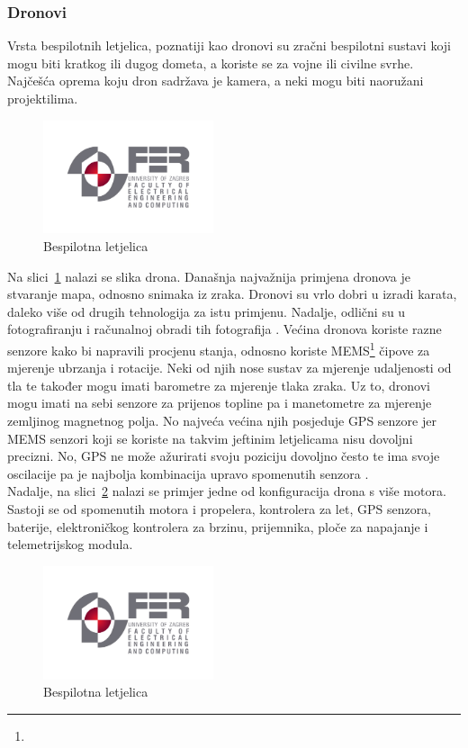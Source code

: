 \documentclass[times, utf8, diplomski]{fer}
\begin{document}
\subsubsection{Dronovi}
Vrsta bespilotnih letjelica, poznatiji kao dronovi su zračni bespilotni sustavi koji mogu biti kratkog ili dugog dometa, a koriste se za vojne ili civilne svrhe. Najčešća oprema koju dron sadržava je kamera, a neki mogu biti naoružani projektilima. 
\begin{figure}[htb]
\centering
\includegraphics[width=5cm]{img/fer_logo.jpg}
\caption{Bespilotna letjelica\protect\footnotemark}
\label{fig:dron}
\end{figure}
Na  slici~\ref{fig:dron}  nalazi  se  slika 
drona. Današnja najvažnija primjena dronova je stvaranje mapa, odnosno snimaka iz zraka. Dronovi su  vrlo dobri u izradi karata, daleko više od drugih tehnologija za istu primjenu. Nadalje, odlični su u fotografiranju i računalnoj  obradi  tih  fotografija \citep[str.~10]{Drones}. Većina dronova koriste razne senzore kako  bi  napravili  procjenu  stanja,  odnosno  koriste  MEMS\footnote{} čipove  za  mjerenje  ubrzanja  i rotacije. Neki od njih nose sustav za mjerenje udaljenosti od tla te također mogu imati barometre za  mjerenje  tlaka  zraka.  Uz  to,  dronovi  mogu  imati  na  sebi senzore  za  prijenos  topline  pa  i manetometre za mjerenje zemljinog magnetnog polja. No najveća većina njih posjeduje GPS senzore jer MEMS senzori koji se koriste na takvim jeftinim letjelicama nisu dovoljni precizni. No, GPS ne može ažurirati svoju poziciju dovoljno često te ima svoje oscilacije pa je najbolja kombinacija  upravo  spomenutih  senzora \citep[str.~13]{Drones}.\\
Nadalje, na slici~\ref{fig:konfiguracijaDrona} nalazi se primjer jedne od konfiguracija drona s više motora. Sastoji  se  od  spomenutih  motora  i  propelera,  kontrolera  za  let,  GPS  senzora,  baterije, elektroničkog kontrolera za brzinu, prijemnika, ploče za napajanje i telemetrijskog modula. 
\begin{figure}[htb]
\centering
\includegraphics[width=5cm]{img/fer_logo.jpg}
\caption{Bespilotna letjelica\protect\footnotemark}
\label{fig:konfiguracijaDrona}
\end{figure}
\end{document}

